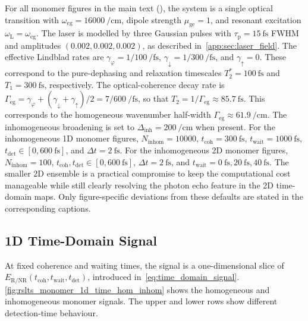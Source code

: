 For all monomer figures in the main text (), the system is a single optical transition with \(\omega_{\mathrm{eg}}=\SI{16000}{\per\centi\metre}\), dipole strength \(\mu_{\mathrm{ge}}=1\), and resonant excitation \(\omega_{\mathrm{L}}=\omega_{\mathrm{eg}}\). The laser is modelled by three Gaussian pulses with \(\tau_{\mathrm{p}}=\SI{15}{\femto\second}\) FWHM and amplitudes \((0.002,0.002,0.002)\), as described in~\autoref{app:sec:laser_field}. The effective Lindblad rates are \(\gamma_{\varphi}=1/100~\si{\per\femto\second}\), \(\gamma_{\downarrow}=1/300~\si{\per\femto\second}\), and \(\gamma_{\uparrow}=0\). These correspond to the pure-dephasing and relaxation timescales \(T_{2}^{*}=\SI{100}{\femto\second}\) and \(T_{1}=\SI{300}{\femto\second}\), respectively. The optical-coherence decay rate is \(\Gamma_{\mathrm{eg}}=\gamma_{\varphi}+(\gamma_{\downarrow}+\gamma_{\uparrow})/2=7/600~\si{\per\femto\second}\), so that \(T_{2}=1/\Gamma_{\mathrm{eg}}\approx\SI{85.7}{\femto\second}\). This corresponds to the homogeneous wavenumber half-width \(\Gamma_{\mathrm{eg}}\approx\SI{61.9}{\per\centi\metre}\). The inhomogeneous broadening is set to \(\Delta_{\mathrm{inh}}=\SI{200}{\per\centi\metre}\) when present. For the inhomogeneous 1D monomer figures, \(N_{\mathrm{inhom}}=10000\), \(t_{\mathrm{coh}}=\SI{300}{\femto\second}\), \(t_{\mathrm{wait}}=\SI{1000}{\femto\second}\), \(t_{\mathrm{det}}\in[0,\SI{600}{\femto\second}]\), and \(\Delta t=\SI{2}{\femto\second}\). For the inhomogeneous 2D monomer figures, \(N_{\mathrm{inhom}}=100\), \(t_{\mathrm{coh}},t_{\mathrm{det}}\in[0,\SI{600}{\femto\second}]\), \(\Delta t=\SI{2}{\femto\second}\), and \(t_{\mathrm{wait}}=\SI{0}{\femto\second},\SI{20}{\femto\second},\SI{40}{\femto\second}\). The smaller 2D ensemble is a practical compromise to keep the computational cost manageable while still clearly resolving the photon echo feature in the 2D time-domain maps. Only figure-specific deviations from these defaults are stated in the corresponding captions.

\subsection{1D Time-Domain Signal}
\label{subsec:results_monomer_1d_time}

At fixed coherence and waiting times, the signal is a one-dimensional slice of \(E_{\mathrm{R/NR}}(t_{\mathrm{coh}},t_{\mathrm{wait}},t_{\mathrm{det}})\), introduced in~\autoref{eq:time_domain_signal}. \autoref{fig:rslts_monomer_1d_time_hom_inhom} shows the homogeneous and inhomogeneous monomer signals. The upper and lower rows show different detection-time behaviour.

